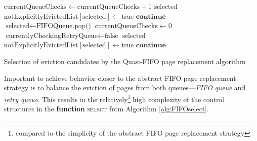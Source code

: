 \begin{@empty}
\begin{algorithm}[ht!]
{\begin{minipage}{\linewidth}
\begin{algorithmic}[1]
                                    \State $\text{currentQueueChecks} \gets \text{currentQueueChecks} + 1$
                                        \Return $\text{selected}$
                                    \Else
                                        \State $\text{notExplicitlyEvictedList}\left[\text{selected}\right] \gets \text{true}$
                                        \State $\textbf{continue}$
                                    \EndIf
                                \Else
                                    \State $\text{selected} \gets \text{FIFOQueue.pop()}$
                                        \State $\text{currentQueueChecks} \gets 0$
                                        \State $\text{currentlyCheckingRetryQueue} \gets \text{false}$
                                        \Return $\text{selected}$
                                    \Else
                                        \State $\text{notExplicitlyEvictedList}\left[\text{selected}\right] \gets \text{true}$
                                        \State $\textbf{continue}$
                                    \EndIf            
                                \EndIf
                            \EndIf
                        \EndWhile
                    \EndFunction
                \end{algorithmic}%
            \end{minipage}%
        }
        \vspace{1em}
        \caption[{\footnotesize \textbf{function} \textsc{select}} of Quasi-FIFO]{Selection of eviction candidates by the Quasi-FIFO page replacement algorithm}
        \label{alg:FIFOselect}
    \end{algorithm}
\end{@empty}

    Important to achieve behavior closer to the abstract FIFO page replacement strategy is to balance the eviction of pages from both queues---\textit{FIFO queue} and \textit{retry queue}. This results in the relatively\footnote{compared to the simplicity of the abstract FIFO page replacement strategy} high complexity of the control structures in the {\footnotesize \textbf{function} \textsc{select}} from Algorithm \ref{alg:FIFOselect}.

